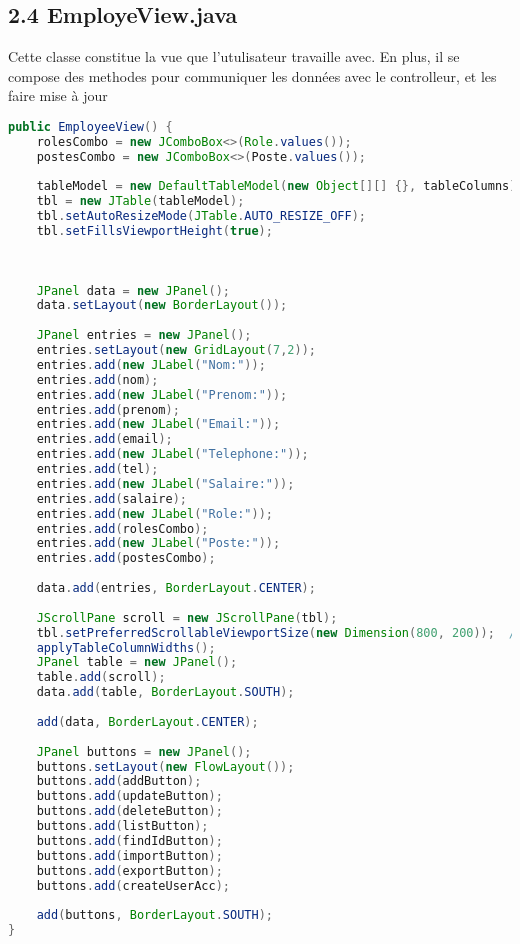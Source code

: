 \documentclass[a4paper,12pt]{report}
\begin{document}
\subsection*{\textcolor{mygreen}{2.4 EmployeView.java}}
Cette classe constitue la vue que l'utulisateur travaille avec. En plus, il se compose des methodes pour communiquer les données avec le controlleur, et les faire mise à jour
\begin{lstlisting}[language=Java, caption=le contructeur de la classe]
public EmployeeView() {
    rolesCombo = new JComboBox<>(Role.values());
    postesCombo = new JComboBox<>(Poste.values());
    
    tableModel = new DefaultTableModel(new Object[][] {}, tableColumns);
    tbl = new JTable(tableModel);
    tbl.setAutoResizeMode(JTable.AUTO_RESIZE_OFF);
    tbl.setFillsViewportHeight(true);
    
    
    
    JPanel data = new JPanel();
    data.setLayout(new BorderLayout());
    
    JPanel entries = new JPanel();
    entries.setLayout(new GridLayout(7,2));
    entries.add(new JLabel("Nom:"));
    entries.add(nom);
    entries.add(new JLabel("Prenom:"));
    entries.add(prenom);
    entries.add(new JLabel("Email:"));
    entries.add(email);
    entries.add(new JLabel("Telephone:"));
    entries.add(tel);
    entries.add(new JLabel("Salaire:"));
    entries.add(salaire);
    entries.add(new JLabel("Role:"));
    entries.add(rolesCombo);
    entries.add(new JLabel("Poste:"));
    entries.add(postesCombo);
    
    data.add(entries, BorderLayout.CENTER);
    
    JScrollPane scroll = new JScrollPane(tbl);	
    tbl.setPreferredScrollableViewportSize(new Dimension(800, 200));  // Adjust as needed
    applyTableColumnWidths();
    JPanel table = new JPanel();
    table.add(scroll);
    data.add(table, BorderLayout.SOUTH);
    
    add(data, BorderLayout.CENTER);
    
    JPanel buttons = new JPanel();
    buttons.setLayout(new FlowLayout());
    buttons.add(addButton);
    buttons.add(updateButton);
    buttons.add(deleteButton);
    buttons.add(listButton);
    buttons.add(findIdButton);
    buttons.add(importButton);
    buttons.add(exportButton);
    buttons.add(createUserAcc);
    
    add(buttons, BorderLayout.SOUTH);
}
\end{lstlisting}
\end{document}
